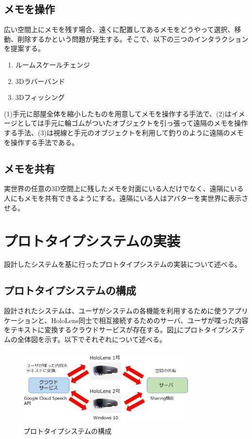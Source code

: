 \documentclass[technicalreport]{ieicej}
\begin{document}
\subsection{メモを操作}
広い空間上にメモを残す場合、遠くに配置してあるメモをどうやって選択、移動、削除するかという問題が発生する。そこで、以下の三つのインタラクションを提案する。

\begin{enumerate}[(1)]
 \item ルームスケールチェンジ
 \item 3Dラバーバンド
 \item 3Dフィッシング
\end{enumerate}

(1)手元に部屋全体を縮小したものを用意してメモを操作する手法で、(2)はイメージとしては手元に輪ゴムがついたオブジェクトを引っ張って遠隔のメモを操作する手法、(3)は視線と手元のオブジェクトを利用して釣りのように遠隔のメモを操作する手法である。

\subsection{メモを共有}
実世界の任意の3D空間上に残したメモを対面にいる人だけでなく、遠隔にいる人にもメモを共有できるようにする。遠隔にいる人はアバターを実世界に表示させる。

\section{プロトタイプシステムの実装}
設計したシステムを基に行ったプロトタイプシステムの実装について述べる。

\subsection{プロトタイプシステムの構成}
設計されたシステムは、ユーザがシステムの各機能を利用するために使うアプリケーションと、HoloLens同士で相互接続するためのサーバ、ユーザが喋った内容をテキストに変換するクラウドサービスが存在する。図\ref{fig:prototypesystem1}にプロトタイプシステムの全体図を示す。以下でそれぞれについて述べる。

\begin{figure}[h]
  \begin{center}
    \includegraphics[clip,height=4.0cm,width=9.0cm]{./prototypesystem1.eps}
    \caption{プロトタイプシステムの構成}
    \label{fig:prototypesystem1}
  \end{center}
\end{figure}
\end{document}
